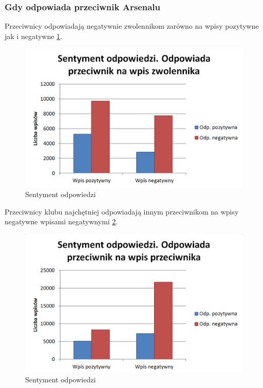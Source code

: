 \clearpage
\subsubsection{Gdy odpowiada przeciwnik Arsenalu}

Przeciwnicy odpowiadają negatywnie zwolennikom zarówno na wpisy pozytywne jak 
i negatywne \ref{image:reply-sentiment-przeciwnik-zwolennik}.

\begin{figure}[ht!] \centering
\includegraphics[width=120mm]{img/reply-sentiment-przeciwnik-zwolennik.png}
\caption{Sentyment odpowiedzi}
\label{image:reply-sentiment-przeciwnik-zwolennik}
\end{figure}


Przeciwnicy klubu najchętniej odpowiadają innym przeciwnikom na wpisy negatywne
wpisami negatywnymi \ref{image:reply-sentiment-przeciwnik-przeciwnik}.

\begin{figure}[ht!] \centering
\includegraphics[width=120mm]{img/reply-sentiment-przeciwnik-przeciwnik.png}
\caption{Sentyment odpowiedzi}
\label{image:reply-sentiment-przeciwnik-przeciwnik}
\end{figure}










